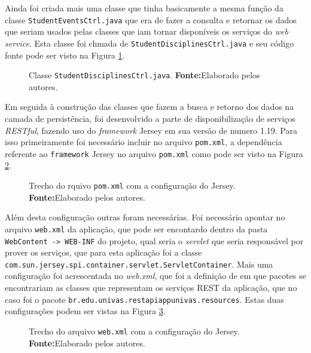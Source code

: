 	\par Ainda foi criada mais uma classe que tinha basicamente a mesma função da
classe \texttt{StudentEventsCtrl.java} que era de fazer a consulta e retornar
os dados que seriam usados pelas classes que iam tornar disponíveis os serviços
do \textit{web service}. Esta classe foi chmada de
\texttt{StudentDisciplinesCtrl.java} e seu código fonte pode ser visto na
Figura \ref{fig:desws23}.

	\begin{figure}[h!]
		
		\caption[Classe StudentDisciplinesCtrl.java]{Classe
		\texttt{StudentDisciplinesCtrl.java}.
		\textbf{Fonte:}Elaborado pelos autores.}
		\label{fig:desws23}
	\end{figure}
	
	\par Em seguida à construção das classes que fazem a busca e retorno dos dados
na camada de persistência, foi desenvolvido a parte de disponibilização de
serviços \textit{RESTful}, fazendo uso do \textit{framework} Jersey em sua
versão de numero {1.19}. Para isso primeiramente foi necessário incluir no
arquivo \texttt{pom.xml}, a dependência referente ao \texttt{framework} Jersey
no arquivo \texttt{pom.xml} como pode ser visto na Figura \ref{fig:desws24}.

	\begin{figure}[h!]
		
		\caption[Trecho do rquivo pom.xml com a configuração do
		Jersey]{Trecho do rquivo \texttt{pom.xml} com a configuração do
		Jersey.
		\textbf{Fonte:}Elaborado pelos autores.}
		\label{fig:desws24}
	\end{figure}
	
	\pagebreak

	\par Além desta configuração outras foram necessárias. Foi necessário apontar
no arquivo \texttt{web.xml} da aplicação, que pode ser encontardo dentro da
pasta \texttt{WebContent -> WEB-INF} do projeto, qual seria o \textit{servlet}
que seria responsável por prover os serviços, que para esta aplicação foi a
classe \texttt{com.sun.jersey.spi.container.servlet.ServletContainer}. Mais uma
configuração foi acrescentada no \textit{web.xml}, que foi a definição de em
que pacotes se encontrariam as classes que representam os serviços REST da
aplicação, que no caso foi o pacote
\texttt{br.edu.univas.restapiappunivas.resources}. Estas duas configurações
podem ser vistas na Figura \ref{fig:desws25}.

	\begin{figure}[h!]
		
		\caption[Trecho do arquivo web.xml com a configuração do
		Jersey]{Trecho do arquivo \texttt{web.xml} com a configuração do
		Jersey.
		\textbf{Fonte:}Elaborado pelos autores.}
		\label{fig:desws25}
	\end{figure}
	
